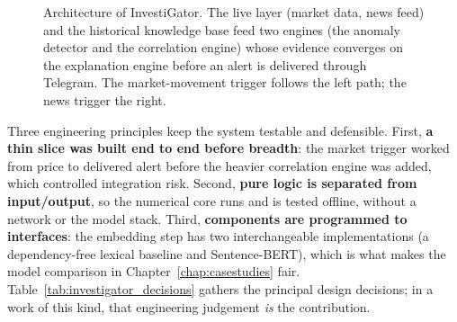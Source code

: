\begin{figure}[ht]
\centering
{}
\caption[System architecture and data flow]{Architecture of InvestiGator. The live layer (market
data, news feed) and the historical knowledge base feed two engines (the anomaly detector and the
correlation engine) whose evidence converges on the explanation engine before an alert is delivered
through Telegram. The market-movement trigger follows the left path; the news trigger the right.}
\label{fig:architecture}
\end{figure}

Three engineering principles keep the system testable and defensible. First, \textbf{a thin slice was built
end to end before breadth}: the market trigger worked from price to delivered alert before the heavier
correlation engine was added, which controlled integration risk. Second, \textbf{pure logic is separated
from input/output}, so the numerical core runs and is tested offline, without a network or the model stack.
Third, \textbf{components are programmed to interfaces}: the embedding step has two interchangeable
implementations (a dependency-free lexical baseline and Sentence-BERT), which is what makes the model
comparison in Chapter~\ref{chap:casestudies} fair. Table~\ref{tab:investigator_decisions} gathers the principal
design decisions; in a work of this kind, that engineering judgement \emph{is} the contribution.

